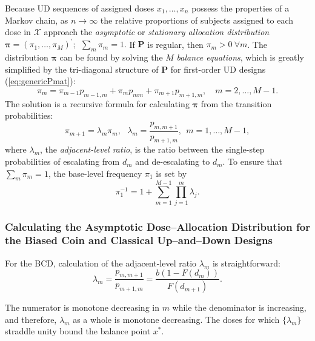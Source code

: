 Because UD sequences of assigned doses $x_1,\ldots,x_n$ possess the properties of a Markov chain, as $n\to\infty$ the relative proportions of subjects assigned to each dose in $\mathcal{X}$ approach the \emph{asymptotic} or \emph{stationary allocation distribution} $\boldsymbol{\pi}=\left(\pi_1,\ldots,\pi_M\right)^{\prime};\ \ \sum_m \pi_m=1.$  If $\mathbf{P}$ is regular, then $\pi_m>0\ \forall m$. The distribution $\boldsymbol{\pi}$ can be found by solving the $M$ \emph{balance equations}, which is greatly simplified by the tri-diagonal structure of $\mathbf{P}$ for first-order UD designs (\ref{eq:genericPmat}):
\begin{equation}\label{eq:balance}
\pi_m=\pi_{m-1}p_{m-1,m}+\pi_mp_{mm}+\pi_{m+1}p_{m+1,m},\quad m=2,\ldots,M-1.
\end{equation}
The solution is a recursive formula for calculating $\boldsymbol{\pi}$ from the transition probabilities:
\begin{equation}\label{eq:balance_solution}
\pi_{m+1}=\lambda_m \pi_m,\ \ \ \lambda_m=\frac{p_{m,m+1}}{p_{m+1,m}},\ \  m=1,\ldots,M-1,
\end{equation}
where $\lambda_m$,  the \emph{adjacent-level ratio}, is the ratio between the single-step probabilities of escalating from $d_m$ and de-escalating to $d_{m}$. To ensure that $\sum_m \pi_m=1$, the base-level frequency $\pi_1$ is set by
\begin{equation*}
\pi_1^{-1}=1+\displaystyle\sum_{m=1}^{M-1}\displaystyle\prod_{j=1}^m\lambda_j.
\end{equation*}

\subsubsection{Calculating the Asymptotic Dose--Allocation Distribution for the Biased Coin
and Classical Up--and--Down Designs}

For the BCD, calculation of the adjacent-level ratio $\lambda_m$ is straightforward:
\begin{equation}\label{eq:BCDlambda}
\lambda_m=\frac{p_{m,m+1}}{p_{m+1,m}}=\frac{b\left(1-F(d_m)\right)}{F(d_{m+1})}.
\end{equation}

\noindent The numerator is monotone decreasing in $m$ while the denominator is increasing, and therefore, $\lambda_m$ as a whole is monotone decreasing. The doses for which $\{\lambda_m\}$ straddle unity bound the balance point $x^*$.

